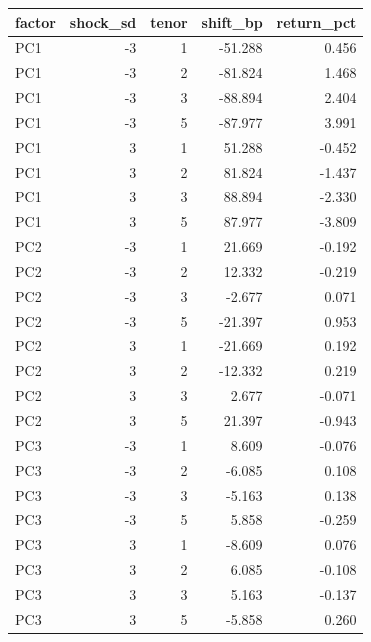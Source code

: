 
\begin{tabular}{lrrrr}
\toprule
factor & shock\_sd & tenor & shift\_bp & return\_pct\\
\midrule
PC1 & -3 & 1 & -51.288 & 0.456\\
PC1 & -3 & 2 & -81.824 & 1.468\\
PC1 & -3 & 3 & -88.894 & 2.404\\
PC1 & -3 & 5 & -87.977 & 3.991\\
PC1 & 3 & 1 & 51.288 & -0.452\\
\addlinespace
PC1 & 3 & 2 & 81.824 & -1.437\\
PC1 & 3 & 3 & 88.894 & -2.330\\
PC1 & 3 & 5 & 87.977 & -3.809\\
PC2 & -3 & 1 & 21.669 & -0.192\\
PC2 & -3 & 2 & 12.332 & -0.219\\
\addlinespace
PC2 & -3 & 3 & -2.677 & 0.071\\
PC2 & -3 & 5 & -21.397 & 0.953\\
PC2 & 3 & 1 & -21.669 & 0.192\\
PC2 & 3 & 2 & -12.332 & 0.219\\
PC2 & 3 & 3 & 2.677 & -0.071\\
\addlinespace
PC2 & 3 & 5 & 21.397 & -0.943\\
PC3 & -3 & 1 & 8.609 & -0.076\\
PC3 & -3 & 2 & -6.085 & 0.108\\
PC3 & -3 & 3 & -5.163 & 0.138\\
PC3 & -3 & 5 & 5.858 & -0.259\\
\addlinespace
PC3 & 3 & 1 & -8.609 & 0.076\\
PC3 & 3 & 2 & 6.085 & -0.108\\
PC3 & 3 & 3 & 5.163 & -0.137\\
PC3 & 3 & 5 & -5.858 & 0.260\\
\bottomrule
\end{tabular}
